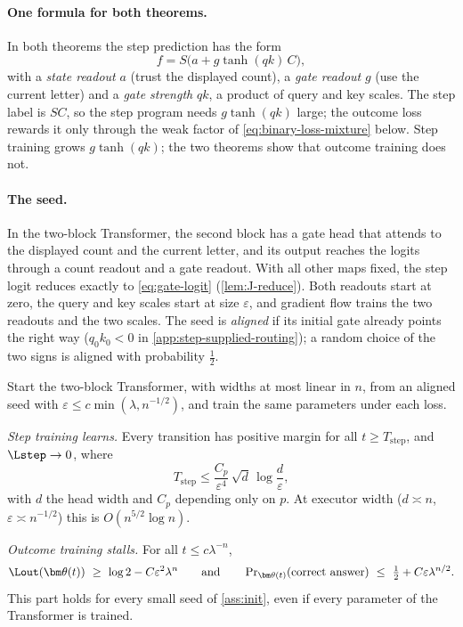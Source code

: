 \paragraph{One formula for both theorems.} In both theorems the step prediction has the form
\begin{equation}
 f=S\bigl(a+g\tanh(qk)\,C\bigr),
 \label{eq:gate-logit}
\end{equation}
with a \emph{state readout} $a$ (trust the displayed count), a \emph{gate readout} $g$ (use the current letter) and a
\emph{gate strength} $qk$, a product of query and key scales. The step label is $SC$, so the step program needs
$g\tanh(qk)$ large; the outcome loss rewards it only through the weak factor of \cref{eq:binary-loss-mixture} below.
Step training grows $g\tanh(qk)$; the two theorems show that outcome training does not.

\paragraph{The seed.} In the two-block Transformer, the second block has a gate head that attends to the displayed count
and the current letter, and its output reaches the logits through a count readout and a gate readout. With all other
maps fixed, the step logit reduces exactly to \cref{eq:gate-logit} (\cref{lem:J-reduce}). Both readouts start at zero, the
query and key scales start at size $\varepsilon$, and gradient flow trains the two readouts and the two scales. The seed is
\emph{aligned} if its initial gate already points the right way ($q_0k_0<0$ in \cref{app:step-supplied-routing}); a random choice
of the two signs is aligned with probability $\frac12$.

\begin{theorem}
\label{thm:time}
Start the two-block Transformer, with widths at most linear in $n$, from an aligned seed with $\varepsilon\le c\min(\lambda,n^{-1/2})$,
and train the same parameters under each loss.
\begin{thmparts}
\item\label{thm:joint} \emph{Step training learns.} Every transition has positive margin for all $t\ge T_{\mathrm{step}}$, and $\Lstep\to0$, where
\[
 T_{\mathrm{step}}\le\frac{C_p}{\varepsilon^4}\,\sqrt{d}\,\log\frac{d}{\varepsilon},
\]
with $d$ the head width and $C_p$ depending only on $p$. At executor width ($d\asymp n$,
$\varepsilon\asymp n^{-1/2}$) this is $O(n^{5/2}\log n)$.
\item\label{thm:outcome-end} \emph{Outcome training stalls.} For all $t\le c\lambda^{-n}$,
\[
 \Lout(\bm\theta(t))\ \ge\ \log2-C\varepsilon^2\lambda^n
 \qquad\text{and}\qquad
 \Pr\nolimits_{\bm\theta(t)}(\text{correct answer})\ \le\ \tfrac12+C\varepsilon\lambda^{n/2}.
\]
This part holds for every small seed of \cref{ass:init}, even if every parameter of the Transformer is trained.
\end{thmparts}
\end{theorem}

